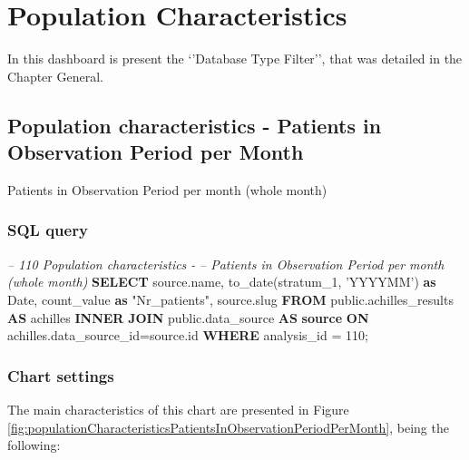 \documentclass[]{book}
\newenvironment{Shaded}{\begin{snugshade}}{\end{snugshade}}
\newcommand{\KeywordTok}[1]{\textcolor[rgb]{0.13,0.29,0.53}{\textbf{#1}}}
\newcommand{\DataTypeTok}[1]{\textcolor[rgb]{0.13,0.29,0.53}{#1}}
\newcommand{\DecValTok}[1]{\textcolor[rgb]{0.00,0.00,0.81}{#1}}
\newcommand{\StringTok}[1]{\textcolor[rgb]{0.31,0.60,0.02}{#1}}
\newcommand{\CommentTok}[1]{\textcolor[rgb]{0.56,0.35,0.01}{\textit{#1}}}
\newcommand{\OtherTok}[1]{\textcolor[rgb]{0.56,0.35,0.01}{#1}}
\newcommand{\FunctionTok}[1]{\textcolor[rgb]{0.00,0.00,0.00}{#1}}
\newcommand{\NormalTok}[1]{#1}
\begin{document}
\chapter{Population Characteristics}\label{population-characteristics}

In this dashboard is present the `'Database Type Filter'', that was
detailed in the Chapter General.

\section{Population characteristics - Patients in Observation Period per
Month}\label{population-characteristics---patients-in-observation-period-per-month}

Patients in Observation Period per month (whole month)

\subsection{SQL query}\label{sql-query-10}

\begin{Shaded}
\begin{Highlighting}[]
\CommentTok{-- 110    Population characteristics - }
\CommentTok{-- Patients in Observation Period per month (whole month)}
\KeywordTok{SELECT}\NormalTok{ source.name, }
       \FunctionTok{to_date}\NormalTok{(stratum_1, }\StringTok{'YYYYMM'}\NormalTok{) }\KeywordTok{as} \DataTypeTok{Date}\NormalTok{,}
\NormalTok{       count_value }\KeywordTok{as} \OtherTok{"Nr_patients"}\NormalTok{,}
\NormalTok{       source.slug}
\KeywordTok{FROM}\NormalTok{ public.achilles_results }\KeywordTok{AS}\NormalTok{ achilles }
    \KeywordTok{INNER} \KeywordTok{JOIN}\NormalTok{ public.data_source }\KeywordTok{AS} \KeywordTok{source} \KeywordTok{ON} 
\NormalTok{      achilles.data_source_id=source.id}
\KeywordTok{WHERE}\NormalTok{ analysis_id = }\DecValTok{110}\NormalTok{;}
\end{Highlighting}
\end{Shaded}

\subsection{Chart settings}\label{chart-settings-10}

The main characteristics of this chart are presented in Figure
\ref{fig:populationCharacteristicsPatientsInObservationPeriodPerMonth},
being the following:
\end{document}

